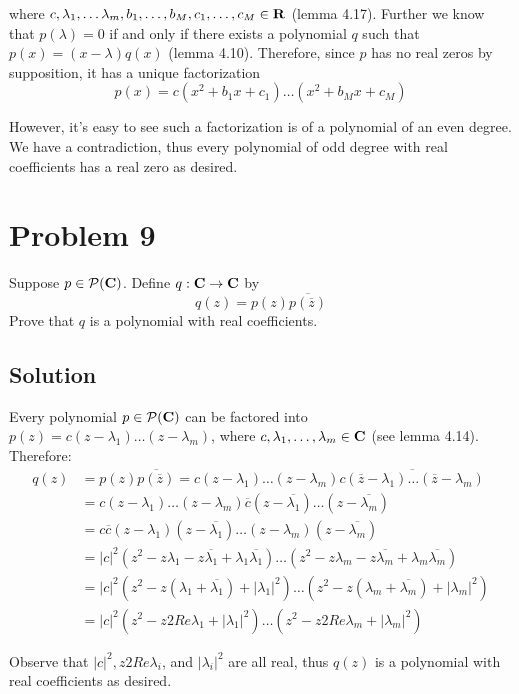 \documentclass{article}
\begin{document}
where $c,\lambda_1,\ldots\lambda_m,b_1,\ldots,b_M,c_1,\ldots,c_M\in\mathbf{R}$ (lemma 4.17). Further we know that $p(\lambda)=0$ if and only if there exists a polynomial $q$ such that $p(x)=(x-\lambda)q(x)$ (lemma 4.10). Therefore, since $p$ has no real zeros by supposition, it has a unique factorization
\[p(x)=c(x^2+b_1x+c_1)\ldots(x^2+b_Mx+c_M)\]

However, it's easy to see such a factorization is of a polynomial of an even degree. We have a contradiction, thus every polynomial of odd degree with real coefficients has a real zero as desired.

\section*{Problem 9}
Suppose $p\in\mathcal{P}(\mathbf{C})$. Define $q:\mathbf{C}\to\mathbf{C}$ by
\[q(z)=p(z)\overline{p(\overline{z})}\]
Prove that $q$ is a polynomial with real coefficients.

\subsection*{Solution}
Every polynomial $p\in\mathcal{P}(\mathbf{C})$ can be factored into $p(z)=c(z-\lambda_1)\ldots(z-\lambda_m)$, where $c,\lambda_1,\ldots,\lambda_m\in\mathbf{C}$ (see lemma 4.14). Therefore:
\begin{align*}
    q(z)&=p(z)\overline{p(\overline{z})}=c(z-\lambda_1)\ldots(z-\lambda_m)\overline{c(\overline{z}-\lambda_1)\ldots(\overline{z}-\lambda_m)}\\
    &=c(z-\lambda_1)\ldots(z-\lambda_m)\overline{c}(z-\overline{\lambda_1})\ldots(z-\overline{\lambda_m})\\
    &=c\overline{c}(z-\lambda_1)(z-\overline{\lambda_1})\ldots(z-\lambda_m)(z-\overline{\lambda_m})\\
    &=\lvert c \rvert^2(z^2 -z\lambda_1 -z\overline{\lambda_1}+\lambda_1\overline{\lambda_1})\ldots(z^2 -z\lambda_m -z\overline{\lambda_m}+\lambda_m\overline{\lambda_m})\\
    &=\lvert c \rvert^2(z^2 -z(\lambda_1+\overline{\lambda_1})+\lvert\lambda_1\rvert^2)\ldots(z^2 -z(\lambda_m+\overline{\lambda_m})+\lvert\lambda_m\rvert^2)\\
    &=\lvert c \rvert^2(z^2 -z2 Re \lambda_1+\lvert\lambda_1\rvert^2)\ldots(z^2 -z2Re\lambda_m+\lvert\lambda_m\rvert^2)
\end{align*}

Observe that $\lvert c \rvert^2, z2 Re \lambda_i$, and $\lvert\lambda_i\rvert^2$ are all real, thus $q(z)$ is a polynomial with real coefficients as desired.
\end{document}
